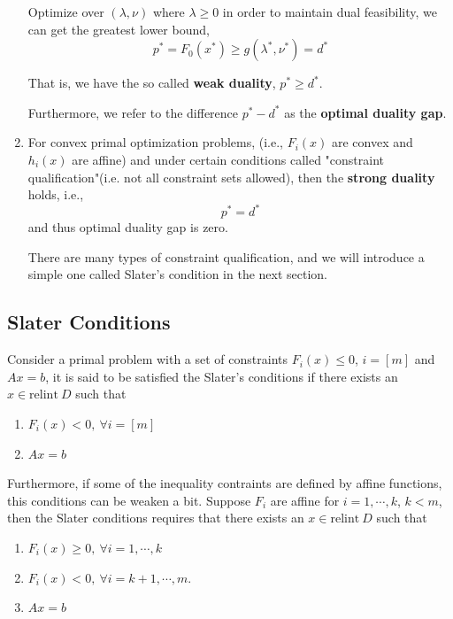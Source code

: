 \begin{enumerate}
Optimize over $(\lambda, \nu)$ where $\lambda \geq 0$ in order to maintain dual feasibility, we can get the greatest lower bound,
\begin{equation*}
p^* = F_0(x^*) \geq g(\lambda^*, \nu^*) = d^*
\end{equation*}

That is, we have the so called \textbf{weak duality}, $p^*\geq d^*$. 

Furthermore, we refer to the difference $p^* - d^*$ as the \textbf{optimal duality gap}.


\item For convex primal optimization problems, (i.e., $F_i(x)$ are convex and $h_i(x)$ are affine) and under certain conditions called "constraint qualification"(i.e. not all constraint sets allowed), then the \textbf{strong duality} holds, i.e.,
 $$p^* = d^*$$
 and thus optimal duality gap is zero.

There are many types of constraint qualification, and we will introduce a simple one called Slater's condition in the next section.

\end{enumerate}


\subsection{Slater Conditions}

\begin{definition}
Consider a primal problem with a set of constraints $F_i(x)\leq 0$, $i = [m]$ and $Ax = b$, it is said to be satisfied the Slater's conditions if there exists an $x\in\text{relint}\ D$ such that

\begin{enumerate}
	\item $F_i(x) < 0,\ \forall i = [m]$
	
	\item $Ax = b$
\end{enumerate}

Furthermore, if some of the inequality contraints are defined by affine functions, this conditions can be weaken a bit. Suppose $F_i$ are affine for $i=1,\cdots, k$, $k<m$, then the Slater conditions requires that there exists an $x\in\text{relint}\ D$ such that
\begin{enumerate}
	\item $F_i(x) \geq 0,\ \forall i = 1,\cdots, k$
	\item $F_i(x) < 0,\ \forall i = k+1,\cdots,m$.
	\item $Ax = b$
\end{enumerate}

\end{definition}

